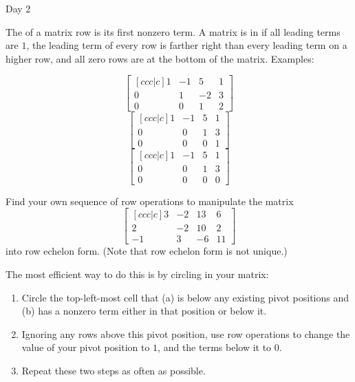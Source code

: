 \begin{applicationActivities}{Day 2}
\begin{definition}
  The  of a matrix row is its first nonzero term.
  A matrix is in  if all leading terms are \(1\),
  the leading term of every row
  is farther right than every leading term on a higher row, and all zero
  rows are at the bottom of the matrix. Examples:
  \begin{multicols}{3}\noindent
    \[
      \begin{bmatrix}[ccc|c]
        1 & -1 &  5 & 1 \\
        0 &  1 & -2 & 3 \\
        0 &  0 &  1 & 2
      \end{bmatrix}
    \]
    \[
      \begin{bmatrix}[ccc|c]
        1 & -1 &  5 & 1 \\
        0 &  0 &  1 & 3 \\
        0 &  0 &  0 & 1
      \end{bmatrix}
    \]
    \[
      \begin{bmatrix}[ccc|c]
        1 & -1 &  5 & 1 \\
        0 &  0 &  1 & 3 \\
        0 &  0 &  0 & 0
      \end{bmatrix}
    \]
  \end{multicols}
\end{definition}

\begin{activity}{10}
  Find your own sequence of row operations to manipulate the matrix
  \[
    \begin{bmatrix}[ccc|c]
      3 & -2 & 13 & 6 \\
      2 & -2 & 10 & 2 \\
      -1 & 3 & -6 & 11
    \end{bmatrix}
  \]
  into row echelon form. (Note that row echelon form is not unique.)

  The most efficient way to do this is by circling 
  in your matrix:
  \begin{enumerate}
    \item Circle the top-left-most cell that (a) is below any existing pivot
    positions and (b) has a nonzero term either in that position or below it.
    \item Ignoring any rows above this pivot position, use row operations
    to change the value of your pivot position to \(1\), and the terms below
    it to \(0\).
    \item Repeat these two steps as often as possible.
  \end{enumerate}
\end{activity}


\end{applicationActivities}
